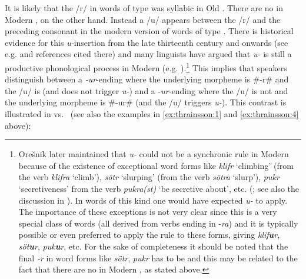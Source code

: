 \documentclass[output=paper,
modfonts
]{LSP/langsci}
\begin{document}
\noindent It is likely that the /r/ in words of type  was syllabic in Old
. There are no  in Modern , on the
other hand. Instead a /u/ appears between the /r/ and the preceding
consonant in the modern version of words of type . There is
historical evidence for this \emph{u-}insertion from the late
thirteenth century and onwards (see e.g. \citealt{kristinsson1992}
and references cited there) and many linguists have argued that
\emph{u-} is still a productive phonological process in Modern
 (e.g.  \citealt{anderson1969a,anderson1969b,oresnik1972,roegnvaldsson1981,kiparsky1984}).\footnote{Orešnik later  maintained that
  \emph{u-} could not be a synchronic rule in Modern 
  because of the existence of exceptional word forms like \emph{klifr}
  `climbing' (from the verb \emph{klifra} `climb'), \emph{sötr}
  `slurping' (from the verb \emph{sötra} `slurp'), \emph{pukr}
  `secretiveness' from the verb \emph{pukra(st)} `be secretive about',
  etc. (\citealt{oresnik1978}; see also the discussion in \citealt{kjartansson1984}). In words of this
  kind one would have expected \emph{u-} to apply. The
  importance of these exceptions is not very clear since this is a very
  special class of words (all derived from verbs ending in -\emph{ra})
  and it is typically possible or even preferred to apply the 
  rule to these forms, giving \emph{klif\textbf{u}r},
  \emph{söt\textbf{u}r}, \emph{puk\textbf{u}r}, etc. For the sake of
  completeness it should be noted that the final \emph{-r} in word forms
  like \emph{sötr}, \emph{pukr} has to be  and this may be
  related to the fact that there are no  in Modern
  , as stated above.} This implies that speakers distinguish
between a \emph{-ur}-ending where the underlying morpheme is \#-r\# and
the /u/ is  (and does not trigger \emph{u-}) and a
-\emph{ur-}ending where the /u/ is not  and the underlying
morpheme is \#-ur\# (and the /u/ triggers \emph{u-}). This
contrast is illustrated in  vs.\  (see also the examples in \ref{ex:thrainsson:1}
and \ref{ex:thrainsson:4} above):
\end{document}
